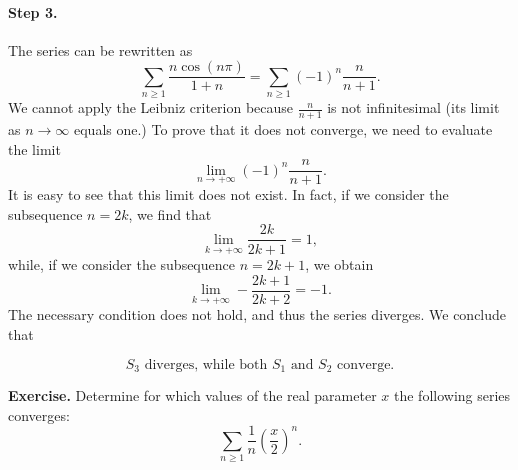 \documentclass[a4paper,10 pt]{report}
\newcommand{\finalanswer}[1]{%
    \begin{finalAnswer}
    \[
        #1
    \]
    \end{finalAnswer}
}
\theoremstyle{definition}
\begin{document}
\begin{solutionBox}
\paragraph{Step 3.} The series can be rewritten as
\begin{equation*}\sum_{n \geq 1} \frac{n \cos(n \pi)}{1 + n} = \sum_{n \geq 1} (-1)^n \frac{n}{n + 1}.\end{equation*}
We cannot apply the Leibniz criterion because $\frac{n}{n+1}$ is not infinitesimal (its limit as $n \to \infty$ equals one.) To prove that it does not converge, we need to evaluate the limit
\begin{equation*} \lim_{n \to + \infty} (-1)^n \frac{n}{n+1}. \end{equation*}
It is easy to see that this limit does not exist. In fact, if we consider the subsequence $n = 2k$, we find that
\begin{equation*} \lim_{k \to + \infty} \frac{2k}{2k+1} = 1, \end{equation*}
while, if we consider the subsequence $n = 2k + 1$, we obtain
\begin{equation*} \lim_{k \to + \infty} - \frac{2k + 1}{2k+2} = -1. \end{equation*}
The necessary condition does not hold, and thus the series diverges. We conclude that
\finalanswer{
\text{$S_3$ diverges, while both $S_1$ and $S_2$ converge}.
}\end{solutionBox}

\begin{exerciseBox} \textbf{Exercise.}  Determine for which values of the real parameter $x$ the following series converges:
\begin{equation*} \sum_{n \geq 1} \frac{1}{n} \left( \frac{x}{2} \right)^n. \end{equation*} \end{exerciseBox}
\end{document}
